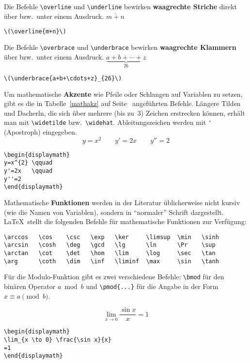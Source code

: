 Die Befehle \lstinline|\overline| und \lstinline|\underline| bewirken
\textbf{waagrechte Striche} direkt über bzw.\ unter einem
Ausdruck.
\exa
\(\overline{m+n}\)
\exb
\begin{verbatim}
\(\overline{m+n}\)
\end{verbatim}
\exc
 
Die Befehle \lstinline|\overbrace| und \lstinline|\underbrace| bewirken
\textbf{waagrechte Klammern} über bzw.\ unter einem Ausdruck.
\exa
\(\underbrace{a+b+\cdots+z}_{26}\)
\exb
\begin{verbatim}
\(\underbrace{a+b+\cdots+z}_{26}\)
\end{verbatim}
\exc
 
Um mathematische \textbf{Akzente} wie Pfeile oder Schlangen auf
Variablen zu setzen, gibt es die in Tabelle~\ref{mathakz} auf
Seite~\pageref{mathakz} angeführten Befehle.
Längere Tilden und Dacherln, die sich über mehrere (bis zu~3)
Zeichen erstrecken können, erhält man mit \lstinline|\widetilde|
bzw.\ \lstinline|\widehat|.
Ableitungszeichen werden mit \lstinline|'| (Apostroph) eingegeben.
\exa
\begin{displaymath}
y=x^{2} \qquad
y'=2x   \qquad
y''=2
\end{displaymath}
\exb
\begin{verbatim}
\begin{displaymath}
y=x^{2} \qquad
y'=2x   \qquad
y''=2
\end{displaymath}
\end{verbatim}
\exc
 
Mathematische \textbf{Funktionen} werden in der Literatur
üblicherweise nicht kursiv (wie die Namen von Variablen),
sondern in "`normaler"' Schrift dargestellt.
\LaTeX\ stellt die folgenden Befehle für mathematische
Funktionen zur Verfügung:
\begin{verbatim}
\arccos   \cos    \csc   \exp   \ker     \limsup  \min   \sinh
\arcsin   \cosh   \deg   \gcd   \lg      \ln      \Pr    \sup
\arctan   \cot    \det   \hom   \lim     \log     \sec   \tan
\arg      \coth   \dim   \inf   \liminf  \max     \sin   \tanh
\end{verbatim}
Für die Modulo-Funktion gibt es zwei verschiedene Befehle:
\lstinline|\bmod| für den binären Operator \(a \bmod b\) und
\lstinline|\pmod{...}| für die Angabe in der Form \(x\equiv a
\pmod{b}\).
 
\exa
\begin{displaymath}
\lim_{x \to 0} \frac{\sin x}{x}
=1
\end{displaymath}
\exb
\begin{verbatim}
\begin{displaymath}
\lim_{x \to 0} \frac{\sin x}{x}
=1
\end{displaymath}
\end{verbatim}
\exc
 
